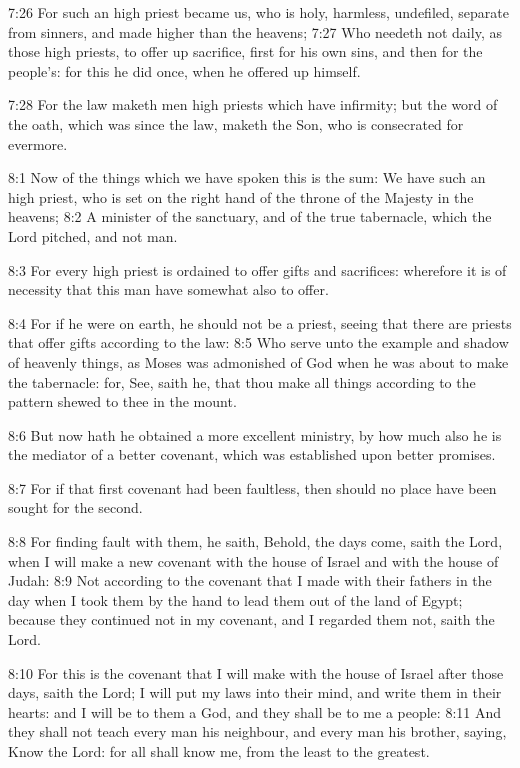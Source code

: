 7:26 For such an high priest became us, who is holy, harmless,
undefiled, separate from sinners, and made higher than the heavens;
7:27 Who needeth not daily, as those high priests, to offer up
sacrifice, first for his own sins, and then for the people's: for this
he did once, when he offered up himself.

7:28 For the law maketh men high priests which have infirmity; but the
word of the oath, which was since the law, maketh the Son, who is
consecrated for evermore.

8:1 Now of the things which we have spoken this is the sum: We have
such an high priest, who is set on the right hand of the throne of the
Majesty in the heavens; 8:2 A minister of the sanctuary, and of the
true tabernacle, which the Lord pitched, and not man.

8:3 For every high priest is ordained to offer gifts and sacrifices:
wherefore it is of necessity that this man have somewhat also to
offer.

8:4 For if he were on earth, he should not be a priest, seeing that
there are priests that offer gifts according to the law: 8:5 Who serve
unto the example and shadow of heavenly things, as Moses was
admonished of God when he was about to make the tabernacle: for, See,
saith he, that thou make all things according to the pattern shewed to
thee in the mount.

8:6 But now hath he obtained a more excellent ministry, by how much
also he is the mediator of a better covenant, which was established
upon better promises.

8:7 For if that first covenant had been faultless, then should no
place have been sought for the second.

8:8 For finding fault with them, he saith, Behold, the days come,
saith the Lord, when I will make a new covenant with the house of
Israel and with the house of Judah: 8:9 Not according to the covenant
that I made with their fathers in the day when I took them by the hand
to lead them out of the land of Egypt; because they continued not in
my covenant, and I regarded them not, saith the Lord.

8:10 For this is the covenant that I will make with the house of
Israel after those days, saith the Lord; I will put my laws into their
mind, and write them in their hearts: and I will be to them a God, and
they shall be to me a people: 8:11 And they shall not teach every man
his neighbour, and every man his brother, saying, Know the Lord: for
all shall know me, from the least to the greatest.

